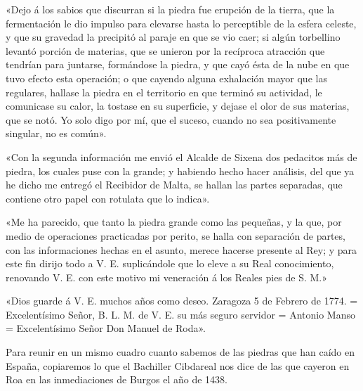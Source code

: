 \documentclass[a4paper, 11pt, oneside, polutonikogreek, spanish]{article}
\begin{document}
«Dejo á los sabios que discurran si la piedra fue erupción de la tierra, que la fermentación le dio impulso para elevarse hasta lo perceptible de la esfera celeste, y que su gravedad la precipitó al paraje en que se vio caer; si algún torbellino levantó porción de materias, que se unieron por la recíproca atracción que tendrían para juntarse, formándose la piedra, y que cayó ésta de la nube en que tuvo efecto esta operación; o que cayendo alguna exhalación mayor que las regulares, hallase la piedra en el territorio en que terminó su actividad, le comunicase su calor, la tostase en su superficie, y dejase el olor de sus materias, que se notó. Yo solo digo por mí, que el suceso, cuando no sea positivamente singular, no es común».

«Con la segunda información me envió el Alcalde de Sixena dos pedacitos más de piedra, los cuales puse con la grande; y habiendo hecho hacer análisis, del que ya he dicho me entregó el Recibidor de Malta, se hallan las partes separadas, que contiene otro papel con rotulata que lo indica».

«Me ha parecido, que tanto la piedra grande como las pequeñas, y la que, por medio de operaciones practicadas por perito, se halla con separación de partes, con las informaciones hechas en el asunto, merece hacerse presente al Rey; y para este fin dirijo todo a V. E. suplicándole que lo eleve a su Real conocimiento, renovando V. E. con este motivo mi veneración á los Reales pies de S. M.»

«Dios guarde á V. E. muchos años como deseo. Zaragoza 5 de Febrero de 1774. = Excelentísimo Señor, B. L. M. de V. E. su más seguro servidor = Antonio Manso = Excelentísimo Señor Don Manuel de Roda».

Para reunir en un mismo cuadro cuanto sabemos de las piedras que han caído en España, copiaremos lo que el Bachiller Cibdareal nos dice de las que cayeron en Roa en las inmediaciones de Burgos el año de 1438.
\end{document}
